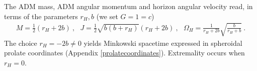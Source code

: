 The ADM mass, ADM angular momentum and horizon angular velocity read, in terms of the parameters $r_H,b$ (we set $G=1=c$)
\begin{equation}
\begin{array}{c}
M=\frac{1}{2}(r_H+2b) \ , \ \ \ 
J=\frac{1}{2}\sqrt{b(b+r_H)}(r_H+2b) \ , \ \ \
\label{Kerr2}
\displaystyle{\Omega_H=\frac{1}{r_H+2b}\sqrt{\frac{b}{r_H+b}}} \ .
\end{array}
\end{equation}
The choice $r_H=-2b\neq 0$
yields Minkowski spacetime expressed in spheroidal prolate coordinates (Appendix \ref{prolatecoordinates}). Extremality occurs when $r_H=0$.
